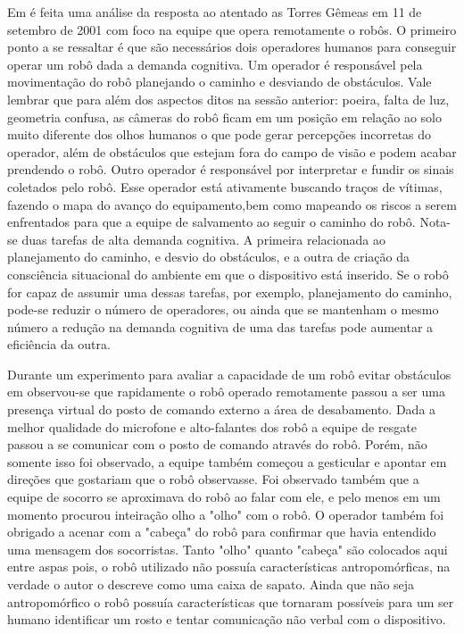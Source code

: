 \documentclass[
	article,			%
	10pt,				%
	oneside,			%
	a4paper,			%
	english,			%
	brazil,				%
	sumario=tradicional	
	]{abntex2}
\begin{document}
Em \cite{Robin2004} é feita uma análise da resposta ao atentado as Torres Gêmeas em 11 de setembro de 2001 com foco na equipe que opera remotamente o robôs. O primeiro ponto a se ressaltar é que são necessários dois operadores humanos para conseguir operar um robô dada a demanda cognitiva. Um operador é responsável pela movimentação do robô planejando o caminho e desviando de obstáculos. Vale lembrar que para além dos aspectos ditos na sessão anterior: poeira, falta de luz, geometria confusa, as câmeras do robô ficam em um posição em relação ao solo muito diferente dos olhos humanos o que pode gerar percepções incorretas do operador, além de obstáculos que estejam fora do campo de visão e podem acabar prendendo o robô.  Outro operador é responsável por interpretar e fundir os sinais coletados pelo robô. Esse operador está ativamente buscando traços de vítimas, fazendo o mapa do avanço do equipamento,bem como mapeando os riscos a serem enfrentados para que a equipe de salvamento ao seguir o caminho do robô. Nota-se duas tarefas de alta demanda cognitiva. A primeira relacionada ao planejamento do caminho, e desvio do obstáculos, e a outra de criação da consciência situacional do ambiente em que o dispositivo está inserido. Se o robô for capaz de assumir uma dessas tarefas, por exemplo, planejamento do caminho, pode-se reduzir o número de operadores, ou ainda que se mantenham o mesmo número a redução na demanda cognitiva de uma das tarefas pode aumentar a eficiência da outra.

Durante um experimento para avaliar a capacidade de um robô evitar obstáculos em \cite{fin2004} observou-se que rapidamente o robô operado remotamente passou a ser uma presença virtual do posto de comando externo a área de desabamento. Dada a melhor qualidade do microfone e alto-falantes dos robô a equipe de resgate passou a se comunicar com o posto de comando através do robô. Porém, não somente isso foi observado, a equipe também começou a gesticular e apontar em direções que gostariam que o robô observasse. Foi observado também que a equipe de socorro se aproximava do robô ao falar com ele, e pelo menos em um momento procurou inteiração olho a "olho" com o robô. O operador também foi obrigado a acenar com a "cabeça" do robô para confirmar que havia entendido uma mensagem dos socorristas. Tanto "olho" quanto "cabeça" são colocados aqui entre aspas pois, o robô utilizado não possuía características antropomórficas, na verdade o autor o descreve como uma caixa de sapato. Ainda que não seja antropomórfico o robô possuía características que tornaram possíveis para um ser humano identificar um rosto e tentar comunicação não verbal com o dispositivo.
\end{document}
